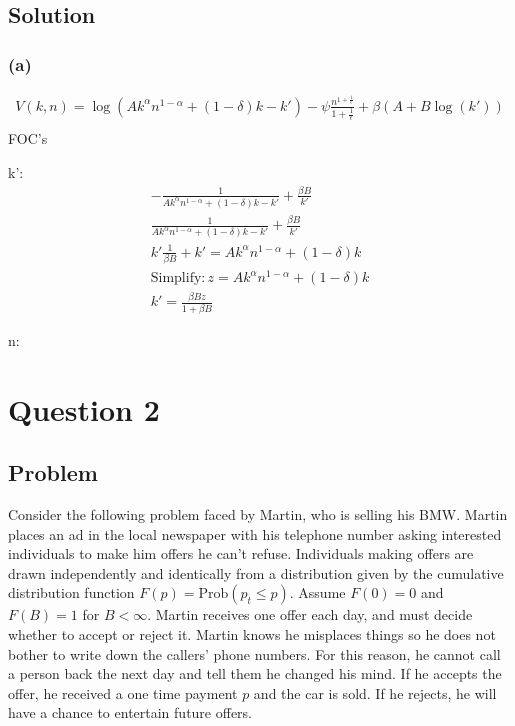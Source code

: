 \documentclass[10pt, a4paper]{article}
\begin{document}
  \subsection*{Solution}
  \subsubsection*{(a)}
    \begin{gather*}
      V(k,n) = \log(Ak^{\alpha}n^{1-\alpha}+(1-\delta)k-k')-\psi\frac{n^{1+\frac{1}{\epsilon}}}{1+\frac{1}{\epsilon}}+\beta(A+B\log(k'))\\
    \end{gather*}
    FOC's
    
    k':
    \begin{gather*}
      -\frac{1}{Ak^{\alpha}n^{1-\alpha}+(1-\delta)k-k'}+\frac{\beta B}{k'}\\
      \frac{1}{Ak^{\alpha}n^{1-\alpha}+(1-\delta)k-k'}+\frac{\beta B}{k'} \\
      k'\frac{1}{\beta B}+k' = Ak^{\alpha}n^{1-\alpha}+(1-\delta)k\\
      \text{Simplify}: z = Ak^{\alpha}n^{1-\alpha}+(1-\delta)k\\
      k' = \frac{\beta Bz}{1+\beta B}
    \end{gather*}
    
    n:
    
\section*{Question 2}
  \subsection*{Problem}
    Consider the following problem faced by Martin, who is selling his BMW. Martin places an ad in the local newspaper with his telephone number asking interested individuals to make him offers he can't refuse. Individuals making offers are drawn independently and identically from a distribution given by the cumulative distribution function $F(p) = \text{Prob}(p_t \leq p)$. Assume $F(0) = 0$ and $F(B) = 1$ for $B < \infty$. Martin receives one offer each day, and must decide whether to accept or reject it. Martin knows he misplaces things so he does not bother to write down the callers' phone numbers. For this reason, he cannot call a person back the next day and tell them he changed his mind. If he accepts the offer, he received a one time payment $p$ and the car is sold. If he rejects, he will have a chance to entertain future offers.
\end{document}
